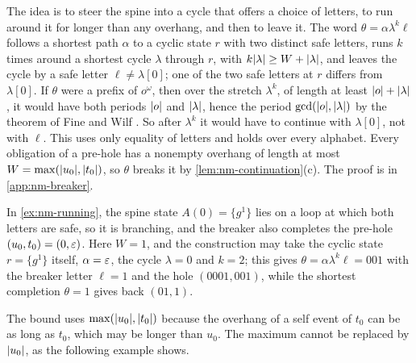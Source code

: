 The idea is to steer the spine into a cycle that offers a choice of letters, to
run around it for longer than any overhang, and then to leave it. The word
$\theta=\alpha\lambda^k\ell$ follows a shortest path $\alpha$ to a cyclic state
$r$ with two distinct safe letters, runs $k$ times around a shortest cycle
$\lambda$ through $r$, with $k\lvert \lambda\rvert\ge W+\lvert \lambda\rvert$, and leaves the
cycle by a safe letter $\ell\ne\lambda[0]$; one of the two safe letters at $r$
differs from $\lambda[0]$. If $\theta$ were a prefix of $o^\omega$, then over
the stretch $\lambda^k$, of length at least $\lvert o\rvert+\lvert \lambda\rvert$, it would have
both periods $\lvert o\rvert$ and $\lvert \lambda\rvert$, hence the period
$\gcd(\lvert o\rvert,\lvert \lambda\rvert)$ by the theorem of Fine and Wilf
\citep{FineWilf65}. So after $\lambda^k$ it would have to continue with
$\lambda[0]$, not with $\ell$. This uses only equality of letters and holds
over every alphabet. Every obligation of a pre-hole has a nonempty overhang of
length at most $W=\max(\lvert u_0\rvert,\lvert t_0\rvert)$, so $\theta$ breaks it by
\cref{lem:nm-continuation}(c). The proof is in \cref{app:nm-breaker}.

In \cref{ex:nm-running}, the spine state $A(0)=\{g^1\}$ lies on a loop at
which both letters are safe, so it is branching, and the breaker also
completes the pre-hole $(u_0,t_0)=(0,\varepsilon)$. Here $W=1$, and the
construction may take the cyclic state $r=\{g^1\}$ itself, $\alpha=\varepsilon$, the
cycle $\lambda=0$ and $k=2$; this gives $\theta=\alpha\lambda^k\ell=001$ with
the breaker letter $\ell=1$ and the hole $(0001,001)$, while the shortest
completion $\theta=1$ gives back $(01,1)$.

The bound uses $\max(\lvert u_0\rvert,\lvert t_0\rvert)$ because the overhang of a self
event of $t_0$ can be as long as $t_0$, which may be longer than $u_0$. The
maximum cannot be replaced by $\lvert u_0\rvert$, as the following example shows.

